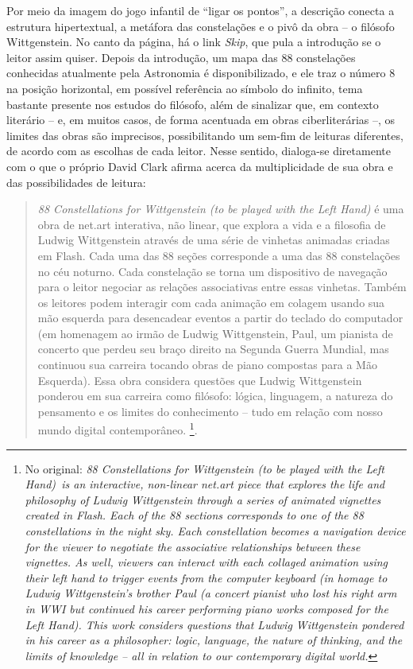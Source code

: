 \documentclass[portuguese]{textolivre}
\begin{document}
Por meio da imagem do jogo infantil de “ligar os pontos”, a descrição conecta a estrutura hipertextual, a metáfora das constelações e o pivô da obra – o filósofo Wittgenstein. No canto da página, há o link \emph{Skip}, que pula a introdução se o leitor assim quiser. Depois da introdução, um mapa das 88 constelações conhecidas atualmente pela Astronomia é disponibilizado, e ele traz o número 8 na posição horizontal, em possível referência ao símbolo do infinito, tema bastante presente nos estudos do filósofo, além de sinalizar que, em contexto literário – e, em muitos casos, de forma acentuada em obras ciberliterárias –, os limites das obras são imprecisos, possibilitando um sem-fim de leituras diferentes, de acordo com as escolhas de cada leitor. Nesse sentido, dialoga-se diretamente com o que o próprio David Clark afirma acerca da multiplicidade de sua obra e das possibilidades de leitura:

\begin{quote}
\emph{88 Constellations for Wittgenstein (to be played with the Left Hand)} é uma obra de net.art interativa, não linear, que explora a vida e a filosofia de Ludwig Wittgenstein através de uma série de vinhetas animadas criadas em Flash. Cada uma das 88 seções corresponde a uma das 88 constelações no céu noturno. Cada constelação se torna um dispositivo de navegação para o leitor negociar as relações associativas entre essas vinhetas. Também os leitores podem interagir com cada animação em colagem usando sua mão esquerda para desencadear eventos a partir do teclado do computador (em homenagem ao irmão de Ludwig Wittgenstein, Paul, um pianista de concerto que perdeu seu braço direito na Segunda Guerra Mundial, mas continuou sua carreira tocando obras de piano compostas para a Mão Esquerda). Essa obra considera questões que Ludwig Wittgenstein ponderou em sua carreira como filósofo: lógica, linguagem, a natureza do pensamento e os limites do conhecimento – tudo em relação com nosso mundo digital contemporâneo. \cite[n. p., tradução nossa]{clark2010}\footnote{No original: \emph{88 Constellations for Wittgenstein (to be played with the Left Hand) is an interactive, non-linear net.art piece that explores the life and philosophy of Ludwig Wittgenstein through a series of animated vignettes created in Flash. Each of the 88 sections corresponds to one of the 88 constellations in the night sky. Each constellation becomes a navigation device for the viewer to negotiate the associative relationships between these vignettes. As well, viewers can interact with each collaged animation using their left hand to trigger events from the computer keyboard (in homage to Ludwig Wittgenstein's brother Paul (a concert pianist who lost his right arm in WWI but continued his career performing piano works composed for the Left Hand). This work considers questions that Ludwig Wittgenstein pondered in his career as a philosopher: logic, language, the nature of thinking, and the limits of knowledge -- all in relation to our contemporary digital world.}}.
\end{quote}
\end{document}
